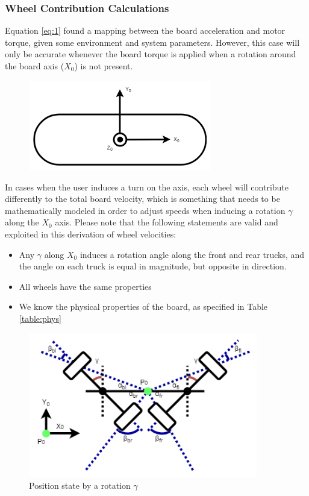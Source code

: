\documentclass[letterpaper,12pt]{article}
\begin{document}
\subsubsection{Wheel Contribution Calculations}
Equation \ref{eq:1} found a mapping between the board acceleration and motor torque, given some environment and system parameters. However, this case will only be accurate whenever the board torque is applied when a rotation around the board axis ($X _{0}$) is not present.

\begin{figure}[h]
\includegraphics[width=8cm]{figs/Board_Axis.png}
\centering
\end{figure}

In cases when the user induces a turn on the axis, each wheel will contribute differently to the total board velocity, which is something that needs to be mathematically modeled in order to adjust speeds when inducing a rotation $\gamma$ along the $X _{0}$ axis. Please note that the following statements are valid and exploited in this derivation of wheel velocities:
\begin{itemize}
    \item Any $\gamma$ along $X _{0}$ induces a rotation angle along the front and rear trucks, and the angle on each truck is equal in magnitude, but opposite in direction.
    \item All wheels have the same properties
    \item We know the physical properties of the board, as specified in Table \ref{table:phys}
\end{itemize}

\begin{figure}[!h]
\caption{Position state by a rotation $\gamma$}
\includegraphics[width=10cm]{figs/Wheel_Reps.png}
\centering
\end{figure}
\end{document}
